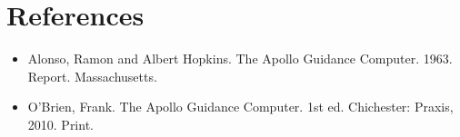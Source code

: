 \documentclass[a4paper,11pt]{article}
\begin{document}

\section{References}

\begin{itemize}
  \item Alonso, Ramon and Albert Hopkins. The Apollo Guidance Computer. 1963. Report. Massachusetts.
  \item O'Brien, Frank. The Apollo Guidance Computer. 1st ed. Chichester: Praxis, 2010. Print.
\end{itemize}
\end{document}
